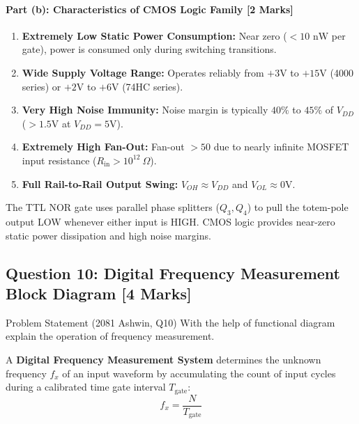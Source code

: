 \documentclass[11pt,a4paper,oneside]{book}
\begin{document}
\paragraph{Part (b): Characteristics of CMOS Logic Family [2 Marks]}
\begin{enumerate}
  \item \textbf{Extremely Low Static Power Consumption:} Near zero ($< 10\text{ nW}$ per gate), power is consumed only during switching transitions.
  \item \textbf{Wide Supply Voltage Range:} Operates reliably from $+3\text{V}$ to $+15\text{V}$ (4000 series) or $+2\text{V}$ to $+6\text{V}$ (74HC series).
  \item \textbf{Very High Noise Immunity:} Noise margin is typically $40\%$ to $45\%$ of $V_{DD}$ ($> 1.5\text{V}$ at $V_{DD}=5\text{V}$).
  \item \textbf{Extremely High Fan-Out:} Fan-out $> 50$ due to nearly infinite MOSFET input resistance ($R_{\text{in}} > 10^{12}\ \Omega$).
  \item \textbf{Full Rail-to-Rail Output Swing:} $V_{OH} \approx V_{DD}$ and $V_{OL} \approx 0\text{V}$.
\end{enumerate}

\begin{answerbox}
The TTL NOR gate uses parallel phase splitters ($Q_3, Q_4$) to pull the totem-pole output LOW whenever either input is HIGH. CMOS logic provides near-zero static power dissipation and high noise margins.
\end{answerbox}

\vspace{0.6cm}

\subsection{Question 10: Digital Frequency Measurement Block Diagram [4 Marks]}
\begin{questionbox}{Problem Statement (2081 Ashwin, Q10)}
With the help of functional diagram explain the operation of frequency measurement.
\end{questionbox}

A \textbf{Digital Frequency Measurement System} determines the unknown frequency $f_x$ of an input waveform by accumulating the count of input cycles during a calibrated time gate interval $T_{\text{gate}}$:
\[
f_x = \frac{N}{T_{\text{gate}}}
\]
\end{document}
